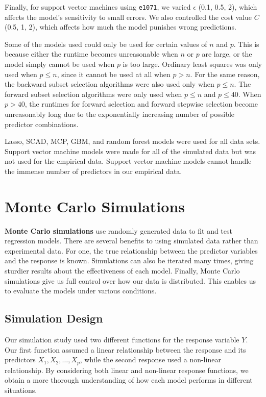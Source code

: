 \documentclass{article}
\begin{document}
	Finally, for support vector machines using \lstinline!e1071!, we varied $\epsilon$ (0.1, 0.5, 2), which affects the model's sensitivity to small errors. We also controlled the cost value $C$ (0.5, 1, 2), which affects how much the model punishes wrong predictions.
	
	Some of the models used could only be used for certain values of $n$ and $p$. This is because either the runtime becomes unreasonable when $n$ or $p$ are large, or the model simply cannot be used when $p$ is too large. Ordinary least squares was only used when $p\leq n$, since it cannot be used at all when $p>n$. For the same reason, the backward subset selection algorithms were also used only when $p\leq n$. The forward subset selection algorithms were only used when $p\leq n$ and $p\leq 40$. When $p>40$, the runtimes for forward selection and forward stepwise selection become unreasonably long due to the exponentially increasing number of possible predictor combinations.
	
	Lasso, SCAD, MCP, GBM, and random forest models were used for all data sets. Support vector machine models were made for all of the simulated data but was not used for the empirical data. Support vector machine models cannot handle the immense number of predictors in our empirical data.
	
	\section{Monte Carlo Simulations}\label{sec:simulations}
	
	\textbf{Monte Carlo simulations} use randomly generated data to fit and test regression  models. There are several benefits to using simulated data rather than experimental data. For one, the true relationship between the predictor variables and the response is known. Simulations can also be iterated many times, giving sturdier results about the effectiveness of each model. Finally, Monte Carlo simulations give us full control over how our data is distributed. This enables us to evaluate the models under various conditions.
	
	
	\subsection{Simulation Design}
	
	Our simulation study used two different functions for the response variable $Y$. Our first function assumed a linear relationship between the response and its predictors $X_1, X_2, \dotsc, X_p$, while the second response used a non-linear relationship. By considering both linear and non-linear response functions, we obtain a more thorough understanding of how each model performs in different situations.
	
\end{document}

